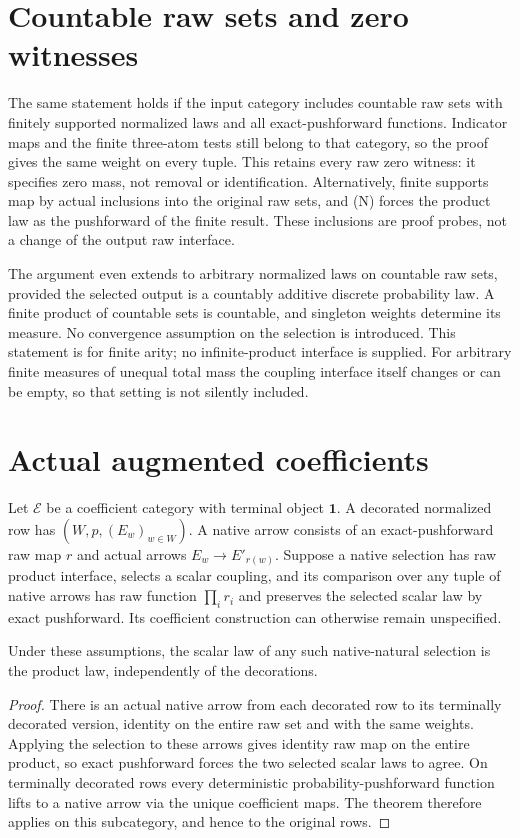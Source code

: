\documentclass{article}
\begin{document}
\section{Countable raw sets and zero witnesses}
The same statement holds if the input category includes countable raw sets
with finitely supported normalized laws and all exact-pushforward functions.
Indicator maps and the finite three-atom tests still belong to that category,
so the proof gives the same weight on every tuple. This retains every raw zero
witness: it specifies zero mass, not removal or identification. Alternatively,
finite supports map by actual inclusions into the original raw sets, and (N)
forces the product law as the pushforward of the finite result. These
inclusions are proof probes, not a change of the output raw interface.

The argument even extends to arbitrary normalized laws on countable raw sets,
provided the selected output is a countably additive discrete probability law.
A finite product of countable sets is countable, and singleton weights determine
its measure. No convergence assumption on the selection is introduced.
This statement is for finite arity; no infinite-product interface is supplied.
For arbitrary finite measures of unequal total mass the coupling interface
itself changes or can be empty, so that setting is not silently included.

\section{Actual augmented coefficients}
Let $\mathcal E$ be a coefficient category with terminal object $\mathbf1$.
A decorated normalized row has $(W,p,(E_w)_{w\in W})$. A native arrow
consists of an exact-pushforward raw map $r$ and actual arrows
$E_w\to E'_{r(w)}$. Suppose a native selection has raw product interface,
selects a scalar coupling, and its comparison over any tuple of native arrows
has raw function $\prod_i r_i$ and preserves the selected scalar law by exact
pushforward. Its coefficient construction can otherwise remain unspecified.

\begin{corollary}
Under these assumptions, the scalar law of any such native-natural selection
is the product law, independently of the decorations.
\end{corollary}
\begin{proof}
There is an actual native arrow from each decorated row to its terminally
decorated version, identity on the entire raw set and with the same weights.
Applying the selection to these arrows gives identity raw map on the entire
product, so exact pushforward forces the two selected scalar laws to agree.
On terminally decorated rows every deterministic probability-pushforward
function lifts to a native arrow via the unique coefficient maps. The theorem
therefore applies on this subcategory, and hence to the original rows.
\end{proof}
\end{document}
